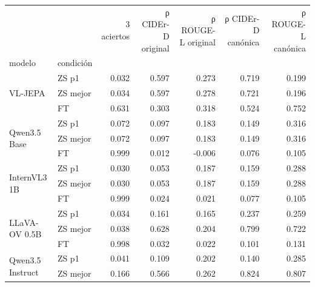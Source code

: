 \begin{tabular}{llrrrrr}
\toprule
 &  & 3 aciertos & ρ CIDEr-D original & ρ ROUGE-L original & ρ CIDEr-D canónica & ρ ROUGE-L canónica \\
modelo & condición &  &  &  &  &  \\
\midrule
\multirow[t]{3}{*}{VL-JEPA} & ZS p1 & 0.032 & 0.597 & 0.273 & 0.719 & 0.199 \\
 & ZS mejor & 0.034 & 0.597 & 0.278 & 0.721 & 0.196 \\
 & FT & 0.631 & 0.303 & 0.318 & 0.524 & 0.752 \\
\cline{1-7}
\multirow[t]{3}{*}{Qwen3.5 Base} & ZS p1 & 0.072 & 0.097 & 0.183 & 0.149 & 0.316 \\
 & ZS mejor & 0.072 & 0.097 & 0.183 & 0.149 & 0.316 \\
 & FT & 0.999 & 0.012 & -0.006 & 0.076 & 0.105 \\
\cline{1-7}
\multirow[t]{3}{*}{InternVL3 1B} & ZS p1 & 0.030 & 0.053 & 0.187 & 0.159 & 0.288 \\
 & ZS mejor & 0.030 & 0.053 & 0.187 & 0.159 & 0.288 \\
 & FT & 0.999 & 0.024 & 0.021 & 0.077 & 0.105 \\
\cline{1-7}
\multirow[t]{3}{*}{LLaVA-OV 0.5B} & ZS p1 & 0.034 & 0.161 & 0.165 & 0.237 & 0.259 \\
 & ZS mejor & 0.038 & 0.628 & 0.204 & 0.799 & 0.722 \\
 & FT & 0.998 & 0.032 & 0.022 & 0.101 & 0.131 \\
\cline{1-7}
\multirow[t]{2}{*}{Qwen3.5 Instruct} & ZS p1 & 0.041 & 0.109 & 0.202 & 0.140 & 0.285 \\
 & ZS mejor & 0.166 & 0.566 & 0.262 & 0.824 & 0.807 \\
\cline{1-7}
\bottomrule
\end{tabular}
